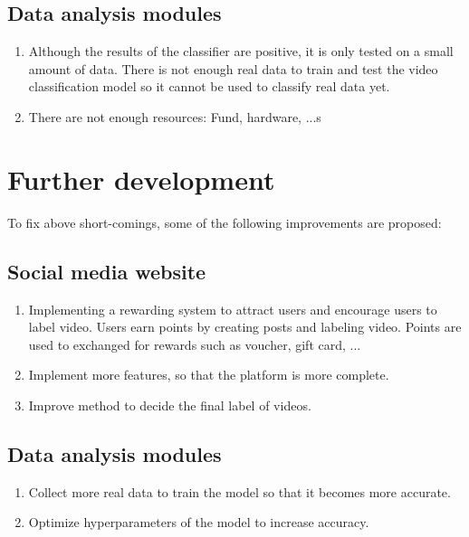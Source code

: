 \subsection{Data analysis modules}
\begin{enumerate}

\item Although the results of the classifier are positive, it is only tested on a small amount of data. There is not enough real data to train and test the video classification model so it cannot be used to classify real data yet.
\item There are not enough resources: Fund, hardware, ...s

\end{enumerate}
\section{Further development}
To fix above short-comings, some of the following improvements are proposed:
\subsection{Social media website}\begin{enumerate}
\item Implementing a rewarding system to attract users and encourage users to label video. Users earn points by creating posts and labeling video. Points are used to exchanged for rewards such as voucher, gift card, ...
\item Implement more features, so that the platform is more complete.
\item Improve method to decide the final label of videos.
\end{enumerate}
\subsection{Data analysis modules}
\begin{enumerate}
\item Collect more real data to train the model so that it becomes more accurate.
\item Optimize hyperparameters of the model to increase accuracy.

\end{enumerate}

